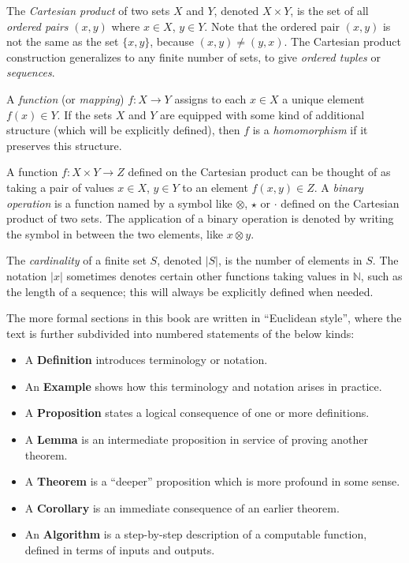 \documentclass[../generics]{subfiles}
\begin{document}
The \emph{Cartesian product} of two sets $X$ and $Y$, denoted \index{$\times$}$X\times Y$, is the set of all \emph{ordered pairs} $(x,y)$ where $x\in X$, $y\in Y$. Note that the ordered pair $(x,y)$ is not the same as the set $\{x,y\}$, because $(x,y)\neq(y,x)$. The Cartesian product construction generalizes to any finite number of sets, to give \emph{ordered tuples} or \emph{sequences}.

A \emph{function} (or \emph{mapping}) $f\colon X\rightarrow Y$ assigns to each $x\in X$ a unique element $f(x)\in Y$. If the sets $X$ and $Y$ are equipped with some kind of additional structure (which will be explicitly defined), then $f$ is a \emph{homomorphism} if it preserves this structure.

A function $f\colon X\times Y\rightarrow Z$ defined on the Cartesian product can be thought of as taking a pair of values $x\in X$, $y\in Y$ to an element $f(x,y)\in Z$. A \emph{binary operation} is a function named by a symbol like $\otimes$, $\star$ or $\cdot$ defined on the Cartesian product of two sets. The application of a binary operation is denoted by writing the symbol in between the two elements, like $x\otimes y$.

The \emph{cardinality} of a finite set $S$, denoted $|S|$, is the number of elements in $S$. The notation $|x|$ sometimes denotes certain other functions taking values in $\mathbb{N}$, such as the length of a sequence; this will always be explicitly defined when needed.

The more formal sections in this book are written in ``Euclidean style'', where the text is further subdivided into numbered statements of the below kinds:
\begin{itemize}
\item A \textbf{Definition} introduces terminology or notation.
\item An \textbf{Example} shows how this terminology and notation arises in practice.
\item A \textbf{Proposition} states a logical consequence of one or more definitions.
\item A \textbf{Lemma} is an  intermediate proposition in service of proving another theorem.
\item A \textbf{Theorem} is a ``deeper'' proposition which is more profound in some sense.
\item A \textbf{Corollary} is an immediate consequence of an earlier theorem.
\item An \textbf{Algorithm} is a step-by-step description of a computable function, defined in terms of inputs and outputs.
\end{itemize}
\end{document}
